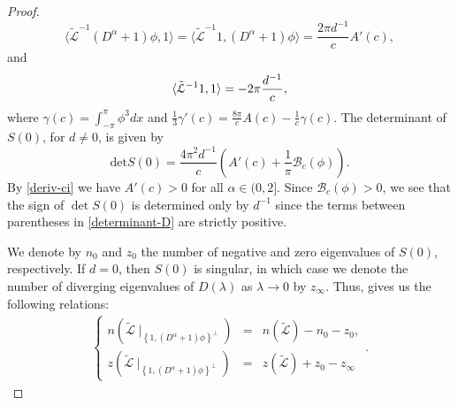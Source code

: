 \documentclass[12pt,reqno]{amsart}
\newcommand{\2}{L^2_{per}(0, T)}
\numberwithin{equation}{section}
\numberwithin{figure}{section}
\begin{document}
\begin{proof}
	\begin{equation}\label{second-term}
	\langle\mathcal{\tilde{L}}^{-1}(D^\alpha +1)\phi, 1 \rangle = \langle \mathcal{\tilde{L}}^{-1}1, (D^\alpha +1)\phi \rangle = \displaystyle \frac{ 2\pi d^{-1}}{c}A'(c),
	\end{equation}
and 	
 \begin{equation}\label{third-term}\langle\mathcal{\tilde{L}}^{-1}1, 1 \rangle=\displaystyle
	 \displaystyle -2 \pi \frac{d^{-1}}{c},
	\end{equation}
where $\gamma(c)= \int_{-\pi}^{\pi} \phi ^3 dx $ and $\frac{1}{3}\gamma'(c) = \frac{8\pi}{c}A(c) - \frac{1}{c}\gamma(c)$. The determinant of $S(0)$, for $d \neq 0$, is given by
	\begin{equation}\label{determinant-D}
	\displaystyle \textrm{det}S(0)= \frac{4\pi^2d^{-1}}{c} \left(A'(c)+ \frac{1}{\pi}\mathcal{B}_c(\phi) \right).
	\end{equation}
 By \eqref{deriv-ci} we have $A'(c)>0$ for all $\alpha\in (0,2]$. Since $\mathcal{B}_c(\phi) >0$, we see that the sign of $\det S(0)$ is determined only by $d^{-1}$ since the terms between parentheses in \eqref{determinant-D} are strictly positive.

We denote by $n_0$ and $z_0$ the number of negative and zero eigenvalues of $S(0)$, respectively. If $d=0$, then $S(0)$ is singular, in which case we denote the number of diverging eigenvalues of $D(\lambda)$ as $\lambda \rightarrow 0$ by $z_{\infty}$. Thus, \cite[Theorem 4.1]{pel-book} gives us the following relations:
\begin{eqnarray*}\displaystyle \left\{
	\begin{array}{ccc}
	  n (\mathcal{\tilde{L}}\mid_{\left\{1, (D^{\alpha}+1)\phi\right\}^{\bot}}) & = & n(\mathcal{\tilde{L}}) - n_0 - z_0,
	\\
	 z ( \mathcal{\tilde{L}}\mid_{\left\{1, (D^{\alpha}+1)\phi\right\}^{\bot}}) & = & z(\mathcal{\tilde{L}}) + z_0 - z_{\infty}
	\end{array}\right..
	\end{eqnarray*}


\end{proof}
\end{document}
